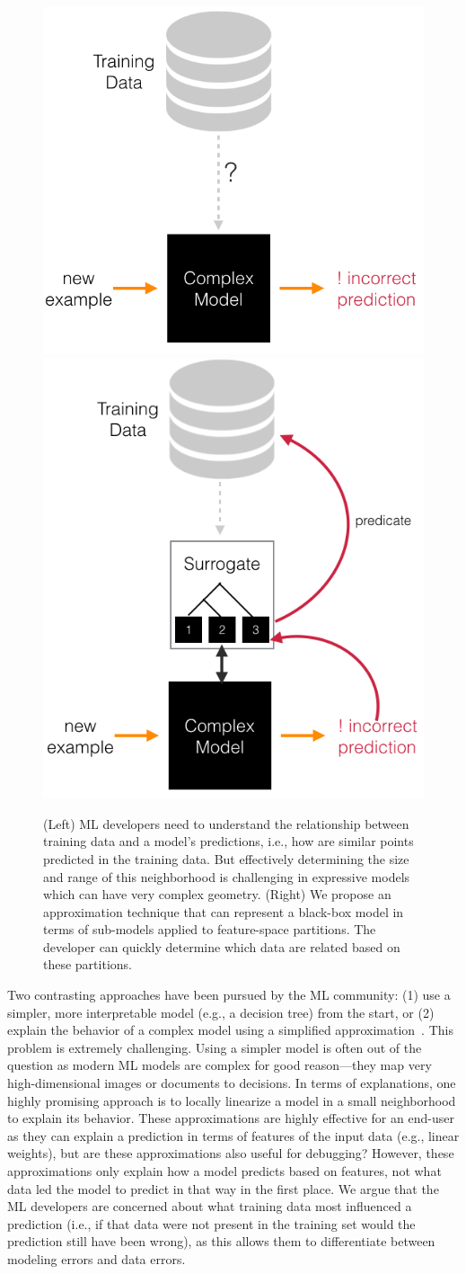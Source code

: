 \begin{figure}
    \centering
    \includegraphics[width=0.35\columnwidth]{figures/teaser1.png}
    \hspace{2em}
    \includegraphics[width=0.35\columnwidth]{figures/teaser2.png}
    \caption{(Left) ML developers need to understand the relationship between training data and a model's predictions, i.e., how are similar points predicted in the training data. But effectively determining the size and range of this neighborhood is challenging in expressive models which can have very complex geometry. (Right) We propose an approximation technique that can represent a black-box model in terms of sub-models applied to feature-space partitions. The developer can quickly determine which data are related based on these partitions.}
    \label{fig:my_label}
\end{figure}

Two contrasting approaches have been pursued by the ML community: (1) use a simpler, more interpretable model (e.g., a decision tree) from the start, or (2) explain the behavior of a complex model using a simplified approximation~\cite{taylor2016alignment, lei2016rationalizing, ribeiro2016should}. This problem is extremely challenging.
Using a simpler model is often out of the question as modern ML models are complex for good reason---they map very high-dimensional images or documents to decisions.
In terms of explanations, one highly promising approach is to locally linearize a model in a small neighborhood to explain its behavior\cite{taylor2016alignment, lei2016rationalizing, ribeiro2016should}.
These approximations are highly effective for an end-user as they can explain a prediction in terms of features of the input data (e.g., linear weights), but are these approximations also useful for debugging?
However, these approximations only explain how a model predicts based on features, not what data led the model to predict in that way in the first place.
We argue that the ML developers are concerned about what training data most influenced a prediction (i.e., if that data were not present in the training set would the prediction still have been wrong), as this allows them to differentiate between modeling errors and data errors.

